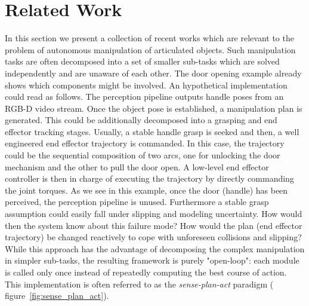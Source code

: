 \section{Related Work}
\label{sec:Related Work}


In this section we present a collection of recent works which are relevant to the problem of autonomous manipulation of articulated objects. Such manipulation tasks are often decomposed into a set of smaller sub-tasks which are solved independently and are unaware of each other. The door opening example already shows which components might be involved. An hypothetical implementation could read as follows. The perception pipeline outputs handle poses from an RGB-D video stream. Once the object pose is established, a manipulation plan is generated. This could be additionally decomposed into a grasping and end effector tracking stages. Usually, a stable handle grasp is seeked and then, a well engineered end effector trajectory is commanded. In this case, the trajectory could be the sequential composition of two arcs, one for unlocking the door mechanism and the other to pull the door open. A low-level end effector controller is then in charge of executing the trajectory by directly commanding the joint torques. As we see in this example, once the door (handle) has been perceived, the perception pipeline is unused. Furthermore a stable grasp assumption could easily fall under slipping and modeling uncertainty. How would then the system know about this failure mode? How would the plan (end effector trajectory) be changed reactively to cope with unforeseen collisions and slipping? While this approach has the advantage of decomposing the complex manipulation in simpler sub-tasks, the resulting framework is purely "open-loop": each module is called only once instead of repeatedly computing the best course of action. This implementation is often referred to as the \emph{sense-plan-act} paradigm ( figure~\ref{fig:sense_plan_act}).     


